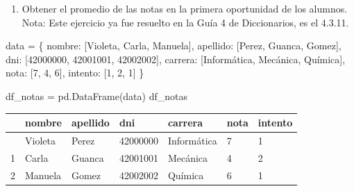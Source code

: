 \documentclass[
  letterpaper,
  DIV=11,
  numbers=noendperiod]{scrreprt}
\newenvironment{Shaded}{\begin{snugshade}}{\end{snugshade}}
\newcommand{\DecValTok}[1]{\textcolor[rgb]{0.68,0.00,0.00}{#1}}
\newcommand{\NormalTok}[1]{\textcolor[rgb]{0.00,0.23,0.31}{#1}}
\newcommand{\OperatorTok}[1]{\textcolor[rgb]{0.37,0.37,0.37}{#1}}
\newcommand{\StringTok}[1]{\textcolor[rgb]{0.13,0.47,0.30}{#1}}
\providecommand{\tightlist}{%
  \setlength{\itemsep}{0pt}\setlength{\parskip}{0pt}}\usepackage{longtable,booktabs,array}
\begin{document}
\begin{enumerate}
\def\labelenumi{\alph{enumi}.}
\tightlist
\item
  Obtener el promedio de las notas en la primera oportunidad de los
  alumnos.\\
  Nota: Este ejercicio ya fue resuelto en la Guía 4 de Diccionarios, es
  el 4.3.11.
\end{enumerate}

\begin{Shaded}
\begin{Highlighting}[]
\NormalTok{data }\OperatorTok{=}\NormalTok{ \{}
    \StringTok{\textquotesingle{}nombre\textquotesingle{}}\NormalTok{: [}\StringTok{\textquotesingle{}Violeta\textquotesingle{}}\NormalTok{, }\StringTok{\textquotesingle{}Carla\textquotesingle{}}\NormalTok{, }\StringTok{\textquotesingle{}Manuela\textquotesingle{}}\NormalTok{],}
    \StringTok{\textquotesingle{}apellido\textquotesingle{}}\NormalTok{: [}\StringTok{\textquotesingle{}Perez\textquotesingle{}}\NormalTok{, }\StringTok{\textquotesingle{}Guanca\textquotesingle{}}\NormalTok{, }\StringTok{\textquotesingle{}Gomez\textquotesingle{}}\NormalTok{],}
    \StringTok{\textquotesingle{}dni\textquotesingle{}}\NormalTok{: [}\DecValTok{42000000}\NormalTok{, }\DecValTok{42001001}\NormalTok{, }\DecValTok{42002002}\NormalTok{],}
    \StringTok{\textquotesingle{}carrera\textquotesingle{}}\NormalTok{: [}\StringTok{\textquotesingle{}Informática\textquotesingle{}}\NormalTok{, }\StringTok{\textquotesingle{}Mecánica\textquotesingle{}}\NormalTok{, }\StringTok{\textquotesingle{}Química\textquotesingle{}}\NormalTok{],}
    \StringTok{\textquotesingle{}nota\textquotesingle{}}\NormalTok{: [}\DecValTok{7}\NormalTok{, }\DecValTok{4}\NormalTok{, }\DecValTok{6}\NormalTok{],}
    \StringTok{\textquotesingle{}intento\textquotesingle{}}\NormalTok{: [}\DecValTok{1}\NormalTok{, }\DecValTok{2}\NormalTok{, }\DecValTok{1}\NormalTok{]}
\NormalTok{\}}

\NormalTok{df\_notas }\OperatorTok{=}\NormalTok{ pd.DataFrame(data)}
\NormalTok{df\_notas}
\end{Highlighting}
\end{Shaded}

\begin{longtable}[]{@{}lllllll@{}}
\toprule\noalign{}
& nombre & apellido & dni & carrera & nota & intento \\
\midrule\noalign{}
\endhead
\bottomrule\noalign{}
\endlastfoot
0 & Violeta & Perez & 42000000 & Informática & 7 & 1 \\
1 & Carla & Guanca & 42001001 & Mecánica & 4 & 2 \\
2 & Manuela & Gomez & 42002002 & Química & 6 & 1 \\
\end{longtable}
\end{document}
